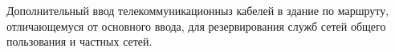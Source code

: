 Дополнительный ввод телекоммуникационныз кабелей в
здание по маршруту, отличающемуся от основного
ввода, для резервирования служб сетей общего пользования и
частных сетей.